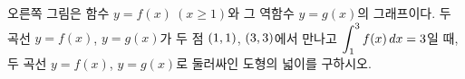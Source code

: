 \noindent\begin{minipage}[t]{0.58\linewidth}\vspace{0pt}\raggedright 오른쪽 그림은 함수 $y=f(x)\ (x\ge 1)$와 그 역함수 $y=g(x)$의 그래프이다. 두 곡선 $y=f(x)$, $y=g(x)$가 두 점 $(1{,}\mkern3mu\mathopen{}1)$, $(3{,}\mkern3mu\mathopen{}3)$에서 만나고 $\displaystyle\int_{1}^{3} f(x)\mkern3mu dx=3$일 때, 두 곡선 $y=f(x)$, $y=g(x)$로 둘러싸인 도형의 넓이를 구하시오.\end{minipage}\hfill\begin{minipage}[t]{0.4\linewidth}\vspace{0pt}\centering \resizebox{\ifdim\width>\linewidth\linewidth\else\width\fi}{!}{}\end{minipage}\par
